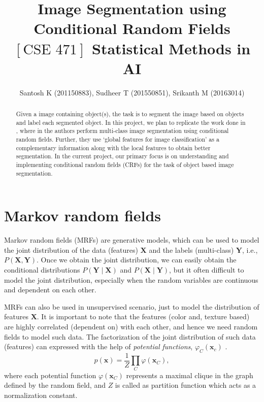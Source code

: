 \documentclass[a4paper]{article}
\title{Image Segmentation using Conditional Random Fields \\
	  $[\textrm{CSE 471}]$ Statistical Methods in AI}
\author{Santosh K (201150883), Sudheer T (201550851), Srikanth M (20163014)}
\date{}
\begin{document}
\maketitle

\begin{abstract}
Given a image containing object(s), the task is to segment the image based on
objects and label each segmented object. In this project, we plan to replicate 
the work done in \cite{icml_2009}, where in the authors perform multi-class 
image segmentation using conditional random fields. Further, they use `global 
features for image classification' as a complementary information along with the 
local features to obtain better segmentation. In the current project, our 
primary focus is on understanding and implementing conditional random fields 
(CRFs) for the task of object based image segmentation.
\end{abstract}


\section{Markov random fields}
\label{sec_mrf}

Markov random fields (MRFs) are generative models, which can be used to model 
the joint distribution of the data (features) $\mathbf{X}$ and the labels 
(multi-class) $\mathbf{Y}$, i.e., $P(\mathbf{X, Y})$. Once we obtain the joint 
distribution, we can easily obtain the conditional distributions $P(\mathbf{Y} 
\mid \mathbf{X})$ and $P(\mathbf{X} \mid \mathbf{Y})$, but it often difficult to 
model the joint distribution, especially when the random variables are 
continuous and dependent on each other.

MRFs can also be used in unsupervised scenario, just to model the distribution 
of features $\mathbf{X}$. It is important to note that the features (color and, 
texture based) are highly correlated (dependent on) with each other, 
and hence we need random fields to model such data. The factorization of the 
joint distribution of such data (features) can expressed with the help of 
\textit{potential functions}, $\varphi_C(\mathbf{x}_c)$ \cite{Bishop:2006:ML}.
\begin{equation}
 p(\mathbf{x}) = \frac{1}{Z} \prod_C \varphi(\mathbf{x}_C),
\end{equation}
where each potential function $\varphi(\mathbf{x}_C)$ represents a maximal 
clique in the graph defined by the random field, and $Z$ is called as partition 
function which acts as a normalization constant.
\end{document}
